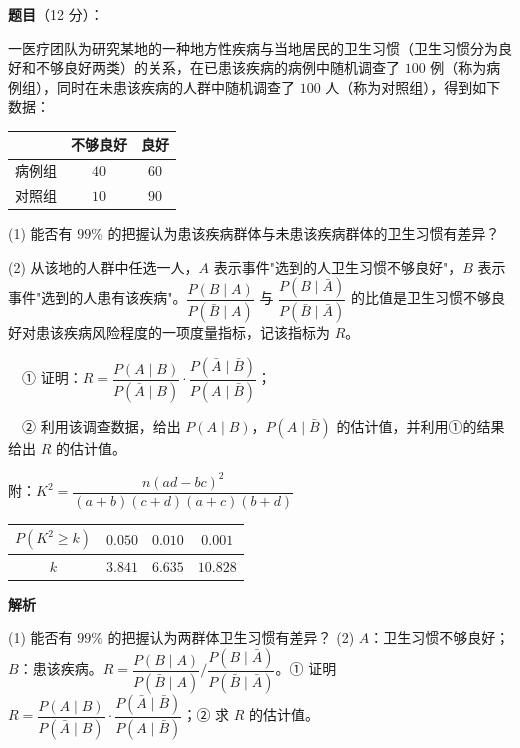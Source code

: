 \begin{answer}

\textbf{题目}（12 分）：

一医疗团队为研究某地的一种地方性疾病与当地居民的卫生习惯（卫生习惯分为良好和不够良好两类）的关系，在已患该疾病的病例中随机调查了 $100$ 例（称为病例组），同时在未患该疾病的人群中随机调查了 $100$ 人（称为对照组），得到如下数据：

\begin{center}
\begin{tabular}{lcc}
\toprule
 & 不够良好 & 良好 \\
\midrule
病例组 & $40$ & $60$ \\
对照组 & $10$ & $90$ \\
\bottomrule
\end{tabular}
\end{center}

  (1) 能否有 $99\%$ 的把握认为患该疾病群体与未患该疾病群体的卫生习惯有差异？

  (2) 从该地的人群中任选一人，$A$ 表示事件"选到的人卫生习惯不够良好"，$B$ 表示事件"选到的人患有该疾病"。$\dfrac{P(B\mid A)}{P(\bar B\mid A)}$ 与 $\dfrac{P(B\mid\bar A)}{P(\bar B\mid\bar A)}$ 的比值是卫生习惯不够良好对患该疾病风险程度的一项度量指标，记该指标为 $R$。

  　① 证明：$R=\dfrac{P(A\mid B)}{P(\bar A\mid B)}\cdot\dfrac{P(\bar A\mid\bar B)}{P(A\mid\bar B)}$；

  　② 利用该调查数据，给出 $P(A\mid B)$，$P(A\mid\bar B)$ 的估计值，并利用①的结果给出 $R$ 的估计值。

  附：$K^{2}=\dfrac{n(ad-bc)^{2}}{(a+b)(c+d)(a+c)(b+d)}$

\begin{center}
\begin{tabular}{cccc}
\toprule
$P\left(K^{2}\ge k\right)$ & $0.050$ & $0.010$ & $0.001$ \\
\midrule
$k$ & $3.841$ & $6.635$ & $10.828$ \\
\bottomrule
\end{tabular}
\end{center}

\textbf{解析}

  (1) 能否有 $99\%$ 的把握认为两群体卫生习惯有差异？
  (2) $A$：卫生习惯不够良好；$B$：患该疾病。$R=\dfrac{P(B\mid A)}{P(\bar B\mid A)}\Big/\dfrac{P(B\mid\bar A)}{P(\bar B\mid\bar A)}$。① 证明 $R=\dfrac{P(A\mid B)}{P(\bar A\mid B)}\cdot\dfrac{P(\bar A\mid\bar B)}{P(A\mid\bar B)}$；② 求 $R$ 的估计值。


\end{answer}
